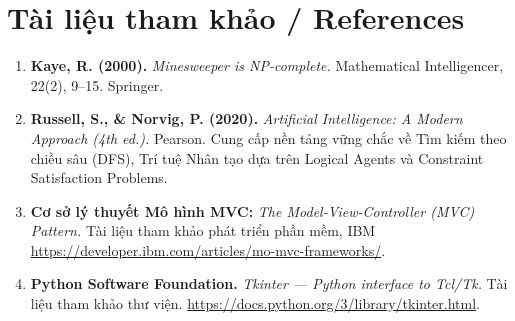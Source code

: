 \section{Tài liệu tham khảo / References}

\begin{enumerate}
    \item \textbf{Kaye, R. (2000).} \textit{Minesweeper is NP-complete.} Mathematical Intelligencer, 22(2), 9–15. Springer.
    \item \textbf{Russell, S., \& Norvig, P. (2020).} \textit{Artificial Intelligence: A Modern Approach (4th ed.).} Pearson. Cung cấp nền tảng vững chắc về Tìm kiếm theo chiều sâu (DFS), Trí tuệ Nhân tạo dựa trên Logical Agents và Constraint Satisfaction Problems.
    \item \textbf{Cơ sở lý thuyết Mô hình MVC:} \textit{The Model-View-Controller (MVC) Pattern.} Tài liệu tham khảo phát triển phần mềm, IBM \url{https://developer.ibm.com/articles/mo-mvc-frameworks/}.
    \item \textbf{Python Software Foundation.} \textit{Tkinter — Python interface to Tcl/Tk.} Tài liệu tham khảo thư viện. \url{https://docs.python.org/3/library/tkinter.html}.
\end{enumerate}
